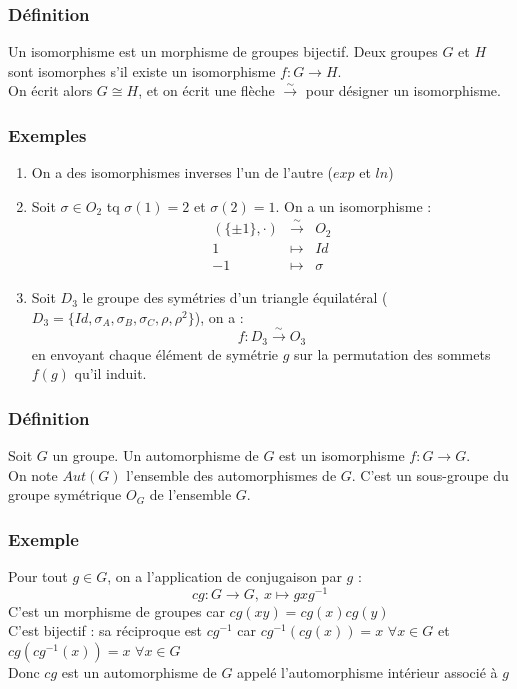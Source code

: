 \documentclass[a4paper, oneside]{report}
\newcommand{\mdg}{morphisme de groupes }
\newcommand{\fong}{\overset{\sim}{\rightarrow}}
\begin{document}
\subsubsection{Définition}
Un isomorphisme est un \mdg bijectif. Deux groupes $G$ et $H$ sont isomorphes s'il existe un isomorphisme $f:G\rightarrow H$.\\
On écrit alors $G\cong H$, et on écrit une flèche $\fong$ pour désigner un isomorphisme.\\

\subsubsection{Exemples}
\begin{enumerate}
\item On a des isomorphismes inverses l'un de l'autre ($exp$ et $ln$)
\item Soit $\sigma \in O_2$ tq $\sigma(1)=2$ et $\sigma(2)=1$. On a un isomorphisme :
$$\begin{array}{lll}
(\{\pm 1\}, \cdot)&\fong & O_2\\
1&\mapsto &Id\\
-1&\mapsto&\sigma
\end{array}$$

\item Soit $D_3$ le groupe des symétries d'un triangle équilatéral ($D_3=\{Id, \sigma_A, \sigma_B, \sigma_C, \rho, \rho^2\}$), on a : 
$$f:D_3 \fong O_3$$
en envoyant chaque élément de symétrie $g$ sur la permutation des sommets $f(g)$ qu'il induit.
\end{enumerate}


\subsubsection{Définition}
Soit $G$ un groupe. Un automorphisme de $G$ est un isomorphisme $f:G\rightarrow G$.\\
On note $Aut(G)$ l'ensemble des automorphismes de $G$. C'est un sous-groupe du groupe symétrique $O_G$ de l'ensemble $G$.

\subsubsection{Exemple}
Pour tout $g\in G$, on a l'application de conjugaison par $g$ :
$$cg : G \rightarrow G,~x\mapsto gxg^{-1}$$
C'est un \mdg  car $cg(xy)=cg(x)cg(y)$\\
C'est bijectif : sa réciproque est $cg^{-1}$ car $cg^{-1}(cg(x))=x$ $\forall x\in G$ et $cg(cg^{-1}(x)) = x$ $ \forall x\in G$\\
Donc $cg$ est un automorphisme de $G$ appelé l'automorphisme intérieur associé à $g$
\end{document}
